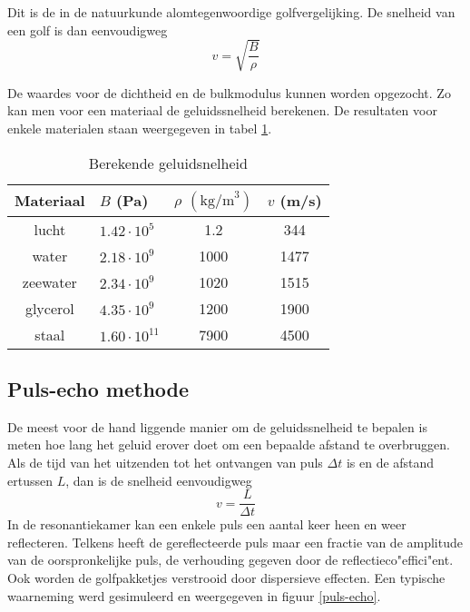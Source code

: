 Dit is de in de natuurkunde alomtegenwoordige golfvergelijking. De snelheid 
van een golf is dan eenvoudigweg
\begin{equation}
\label{speedofsound}
v = \sqrt{\frac{B}{\rho}}
\end{equation}

De waardes voor de dichtheid en de bulkmodulus kunnen worden opgezocht. Zo kan 
men voor een materiaal de geluidssnelheid berekenen. De resultaten voor 
enkele materialen staan weergegeven in tabel \ref{speedtable}. 

\begin{table}[htb]
\caption{Berekende geluidsnelheid}
\label{speedtable}
\begin{center}
\begin{tabular}{c||lcc}
Materiaal & $B$ (Pa) & $\rho$ $(\textrm{kg/m}^3)$ & $v$ (m/s) \\\hline
lucht	& $1.42 \cdot 10^5$	& 1.2  & 344  \\
water	& $2.18 \cdot 10^9$	& 1000 & 1477 \\
zeewater& $2.34 \cdot 10^9$	& 1020 & 1515 \\
glycerol& $4.35 \cdot 10^9$	& 1200 & 1900 \\
staal	& $1.60 \cdot 10^{11}$	& 7900 & 4500 \\
\end{tabular}
\end{center}
\end{table}

\subsection{Puls-echo methode}
De meest voor de hand liggende manier om de geluidssnelheid te bepalen is meten 
hoe lang het geluid erover doet om een bepaalde afstand te overbruggen. Als de 
tijd van het uitzenden tot het ontvangen van puls $\Delta t$ is en de 
afstand ertussen $L$, dan is de snelheid eenvoudigweg
$$
v = \frac{L}{\Delta t}
$$
In de resonantiekamer kan een enkele puls een aantal keer heen en weer 
reflecteren. Telkens heeft de gereflecteerde puls maar een fractie van de 
amplitude van de oorspronkelijke puls, de verhouding gegeven door de 
reflectieco"effici"ent.  Ook worden de golfpakketjes verstrooid door 
dispersieve effecten. Een typische waarneming werd gesimuleerd en weergegeven 
in figuur \ref{puls-echo}. 


